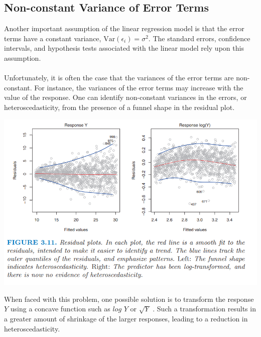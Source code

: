 \subsection{Non-constant Variance of Error Terms}
Another important assumption of the linear regression model is that the error terms have a constant variance, $\text{Var}(\epsilon_i) = \sigma^2$. The standard errors, confidence intervals, and hypothesis tests associated with the linear model rely upon this assumption.\\\\
Unfortunately, it is often the case that the variances of the error terms are non-constant. For instance, the variances of the error terms may increase with the value of the response. One can identify non-constant variances in the errors, or heteroscedasticity, from the presence of a funnel shape in the residual plot.
\begin{center}
    \includegraphics[scale=0.8]{images/non-const-var.png}
\end{center}
When faced with this problem, one possible solution is to transform the response $Y$ using a concave function such as $log \,\,Y$ or $\sqrt{Y}$ . Such a transformation results in a greater amount of shrinkage of the larger responses, leading to a reduction in heteroscedasticity.

